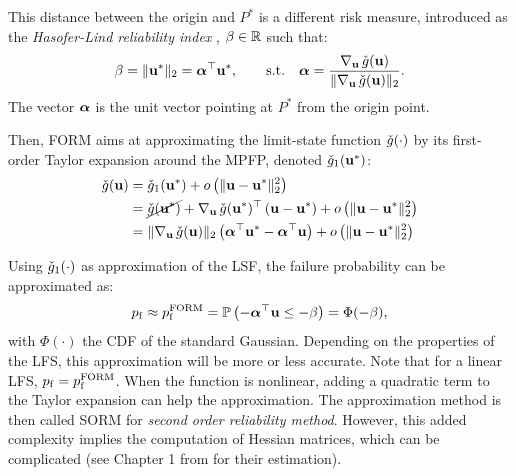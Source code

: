 This distance between the origin and $P^*$ is a different risk measure, introduced as the \textit{Hasofer-Lind reliability index} , $\beta \in \mathbb{R}$ such that:
\begin{equation}
    \beta = \Vert {\bf u}^* \Vert_2 = {\boldsymbol{\alpha}} ^\top {\bf u}^*, \qquad \mathrm{s.t.} \quad
        {\boldsymbol{\alpha}} = \frac{\nabla_{{\bf u}} \,  \check{g}({\bf u})}{\Vert \nabla_{{\bf u}} \,  \check{g}({\bf u}) \Vert_2}.      
\end{equation}
The vector ${\boldsymbol{\alpha}}$ is the unit vector pointing at $P^*$ from the origin point. 

Then, FORM aims at approximating the limit-state function $\check{g}(\cdot)$ by its first-order Taylor expansion around the MPFP, denoted $\check{g}_1({\bf u}^*)$: 
\begin{equation}
    \begin{split}
        \check{g}({\bf u}) &= \check{g}_1({\bf u}^*) + o\left(\Vert {\bf u} - {\bf u}^* \Vert_2^2\right)\\
                 &= \cancel{\check{g}({\bf u}^*)} + \nabla_{{\bf u}} \,  \check{g}({\bf u}^*)^\top \left({\bf u} -{\bf u}^* \right) + o\left(\Vert {\bf u} - {\bf u}^* \Vert_2^2\right)\\
                 &= \Vert \nabla_{{\bf u}} \, \check{g}({\bf u}) \Vert_2 \left({\boldsymbol{\alpha}}^\top {\bf u}^* - {\boldsymbol{\alpha}}^\top {\bf u} \right) + o\left(\Vert {\bf u} - {\bf u}^* \Vert_2^2\right)
    \end{split}    
\end{equation}
 
Using $\check{g}_1(\cdot)$ as approximation of the LSF, the failure probability can be approximated as: 
\begin{equation}
    p_\mathrm{f} \approx p_\mathrm{f}^{\mathrm{FORM}} = \mathbb{P}\left(- {\boldsymbol{\alpha}}^\top {\bf u} \leq -\beta\right) = \Phi(-\beta),
\end{equation} 
with $\Phi(\cdot)$ the CDF of the standard Gaussian. 
Depending on the properties of the LFS, this approximation will be more or less accurate. 
Note that for a linear LFS, $p_\mathrm{f} = p_\mathrm{f}^{\mathrm{FORM}}$. 
When the function is nonlinear, adding a quadratic term to the Taylor expansion can help the approximation. 
The approximation method is then called SORM for \textit{second order reliability method}. 
However, this added complexity implies the computation of Hessian matrices, which can be complicated (see Chapter 1 from \citet{bourinet_2018} for their estimation).


